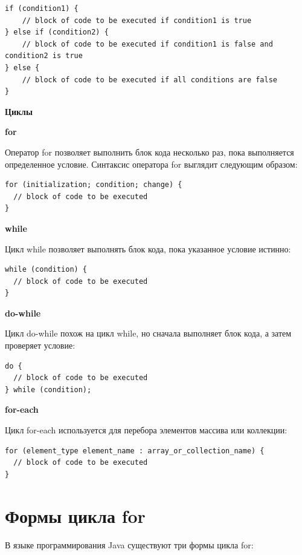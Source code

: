 \begin{lstlisting}
if (condition1) {
    // block of code to be executed if condition1 is true
} else if (condition2) {
    // block of code to be executed if condition1 is false and condition2 is true
} else {
    // block of code to be executed if all conditions are false
}
\end{lstlisting}

\textbf{Циклы}

\textbf{for}

Оператор for позволяет выполнить блок кода несколько раз, пока выполняется определенное условие. Синтаксис оператора for выглядит следующим образом:

\begin{lstlisting}
for (initialization; condition; change) {
  // block of code to be executed
}
\end{lstlisting}

\textbf{while}

Цикл while позволяет выполнять блок кода, пока указанное условие истинно:

\begin{lstlisting}
while (condition) {
  // block of code to be executed
}
\end{lstlisting}

\textbf{do-while}

Цикл do-while похож на цикл while, но сначала выполняет блок кода, а затем проверяет условие:

\begin{lstlisting}
do {
  // block of code to be executed
} while (condition);
\end{lstlisting}

\textbf{for-each}

Цикл for-each используется для перебора элементов массива или коллекции:

\begin{lstlisting}
for (element_type element_name : array_or_collection_name) {
  // block of code to be executed
}
\end{lstlisting}

\section{Формы цикла for}

В языке программирования Java существуют три формы цикла for:

